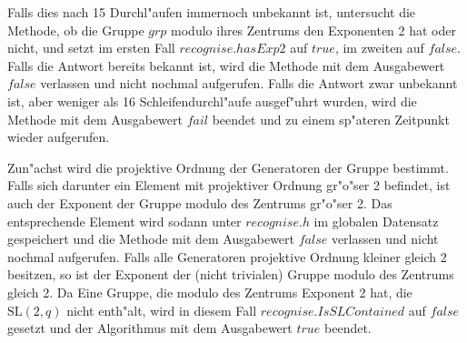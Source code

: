 \documentclass[a4paper,11pt]{article}
\theoremstyle{bla}
\begin{document}
Falls dies nach 15 Durchl"aufen immernoch unbekannt ist, untersucht die Methode, ob die Gruppe $grp$ modulo ihres Zentrums den Exponenten 2 hat oder nicht, und setzt im ersten Fall $recognise.hasExp2$ auf $true$, im zweiten auf $false$. Falls die Antwort bereits bekannt ist, wird die Methode mit dem Ausgabewert $false$ verlassen und nicht nochmal aufgerufen. Falls die Antwort zwar unbekannt ist, aber weniger als 16 Schleifendurchl"aufe ausgef"uhrt wurden, wird die Methode mit dem Ausgabewert $fail$ beendet und zu einem sp"ateren Zeitpunkt wieder aufgerufen.

Zun"achst wird die projektive Ordnung der Generatoren der Gruppe bestimmt. Falls sich darunter ein Element mit projektiver Ordnung gr"o"ser 2 befindet, ist auch der Exponent der Gruppe modulo des Zentrums gr"o"ser 2. Das entsprechende Element wird sodann unter $recognise.h$ im globalen Datensatz gespeichert und die Methode mit dem Ausgabewert $false$ verlassen und nicht nochmal aufgerufen. Falls alle Generatoren projektive Ordnung kleiner gleich 2 besitzen, so ist der Exponent der (nicht trivialen) Gruppe modulo des Zentrums gleich 2. Da Eine Gruppe, die modulo des Zentrums Exponent 2 hat, die $\textrm{SL}(2,q)$ nicht enth"alt, wird in diesem Fall $recognise.IsSLContained$ auf $false$ gesetzt und der Algorithmus mit dem Ausgabewert $true$ beendet.
\end{document}
